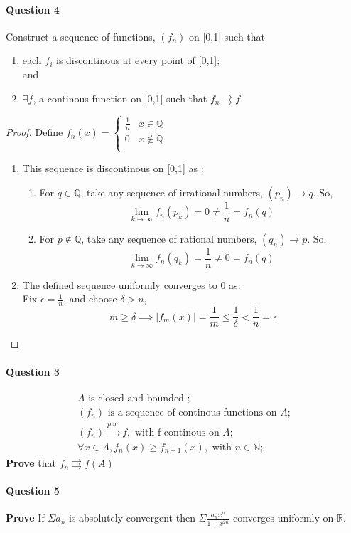 \documentclass[20pt,a4paper]{extarticle} %
\begin{document}
\paragraph{Question 4}
Construct a sequence of functions, $(f_n)$  on [0,1] such that
	\begin{enumerate}[label=(\alph*)]
		\item each $f_i$ is discontinous at every point of [0,1]; \\
			and
		\item $\exists f$, a continous function on [0,1] such that $f_n \rightrightarrows f$
	\end{enumerate}
	\begin{proof}
		Define $f_n(x)=
		\begin{cases}
			\frac{1}{n} & x \in \mathbb{Q} \\
			0 & x \not \in \mathbb{Q} \\
		\end{cases}$
			\begin{enumerate}[label=(\alph*)]
				\item This sequence is discontinous on [0,1] as :\begin{enumerate}[label=(\roman*)]
					\item For $q\in \mathbb{Q}$, take any sequence of irrational numbers,
						$(p_n)\rightarrow q$. So,
						\[ \lim_{k \to \infty} f_n(p_k)=0\neq \frac{1}{n} = f_n(q) \]
					\item For $p \not \in \mathbb{Q}$, take any sequence of rational numbers,
						$(q_n)\rightarrow p$. So,
						\[ \lim_{k \to \infty} f_n(q_k)=\frac{1}{n}\neq 0= f_n(q) \]
				\end{enumerate}
			\item The defined sequence uniformly converges to 0 as:\\
				Fix $\epsilon = \frac{1}{n}$, and choose  $\delta > n $,
				\[ m \geq \delta \implies |f_m(x)|=\frac{1}{m} \leq \frac{1}{\delta} < \frac{1}{n} = \epsilon \]
			\end{enumerate}

	\end{proof}

\paragraph{Question 3}
\begin{eqnarray*}
	A \text{ is closed and bounded }; \\
	(f_n) \text{ is a sequence of continous functions on }A; \\
	(f_n) \xrightarrow{p.w.} f, \text{ with f continous on }A; \\
	\forall x \in A, f_n(x) \geq f_{n+1}(x), \text{ with } n \in \mathbb{N};
\end{eqnarray*}
\textbf{Prove} that $f_n \rightrightarrows f(A)$ \\

\paragraph{Question 5}
\textbf{Prove} If $\Sigma a_n$ is absolutely convergent then $\Sigma \frac{a_n x^n}{1+x^{2n}}$ converges uniformly on $\mathbb{R}.$
\end{document}
